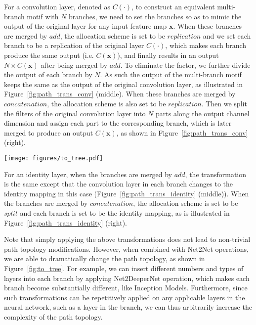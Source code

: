 \documentclass{article}
\newcommand{\bs}{\boldsymbol}
\newcommand{\bx}{\bs{x}}
\begin{document}
For a convolution layer, denoted as $C(\cdot)$, to construct an equivalent multi-branch motif with $N$ branches, we need to set the branches so as to mimic the output of the original layer for any input feature map $\bx$. When these branches are merged by $add$, the allocation scheme is set to be $replication$ and we set each branch to be a replication of the original layer $C(\cdot)$, which makes each branch produce the same output (i.e. $C(\bx)$), and finally results in an output $N \times C(\bx)$ after being merged by $add$. To eliminate the factor, we further divide the output of each branch by $N$. As such the output of the multi-branch motif keeps the same as the output of the original convolution layer, as illustrated in Figure~\ref{fig:path_trans_conv} (middle).
When these branches are merged by $concatenation$, the allocation scheme is also set to be $replication$. Then we split the filters of the original convolution layer into $N$ parts along the output channel dimension and assign each part to the corresponding branch, which is later merged to produce an output $C(\bx)$, as shown in Figure~\ref{fig:path_trans_conv} (right).

\begin{figure*}[t]
	\centering
	\texttt{[image: figures/to\_tree.pdf]}
    \vspace{-10pt}
	\caption{An illustration of transforming a single layer to a tree-structured motif via path-level transformation operations, where we apply Net2DeeperNet operation to replace an identity mapping with a $3 \times 3$ depthwise-separable convolution in (c). }\label{fig:to_tree}
\end{figure*}

For an identity layer, when the branches are merged by $add$, the transformation is the same except that the convolution layer in each branch changes to the identity mapping in this case (Figure~\ref{fig:path_trans_identity} (middle)). When the branches are merged by $concatenation$, the allocation scheme is set to be $split$ and each branch is set to be the identity mapping, as is illustrated in Figure~\ref{fig:path_trans_identity} (right).

Note that simply applying the above transformations does not lead to non-trivial path topology modifications. However, when combined with Net2Net operations, we are able to dramatically change the path topology, as shown in Figure~\ref{fig:to_tree}. For example, we can insert different numbers and types of layers into each branch by applying Net2DeeperNet operation, which makes each branch become substantially different, like Inception Models. Furthermore, since such transformations can be repetitively applied on any applicable layers in the neural network, such as a layer in the branch, we can thus arbitrarily increase the complexity of the path topology.
\end{document}
